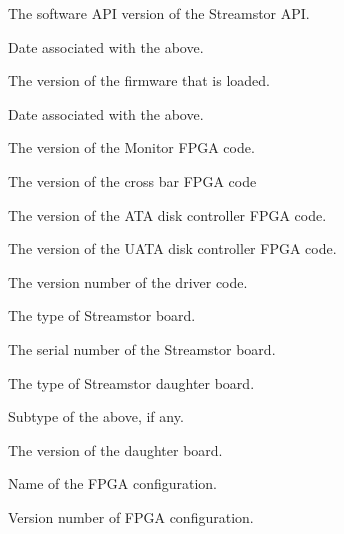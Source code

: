 \begin{description}
\begin{description}
\item{} The software API version of the Streamstor API.
\item{} Date associated with the above.
\item{} The version of the firmware that is loaded.
\item{} Date associated with the above.
\item{} The version of the Monitor FPGA code.
\item{} The version of the cross bar FPGA code
\item{} The version of the ATA disk controller FPGA code.
\item{} The version of the UATA disk controller FPGA code.
\item{} The version number of the driver code.
\item{} The type of Streamstor board.
\item{} The serial number of the Streamstor board.
\item{} The type of Streamstor daughter board.
\item{} Subtype of the above, if any.
\item{} The version of the daughter board.
\item{} Name of the FPGA configuration.
\item{} Version number of FPGA configuration.
\end{description}


\end{description}

